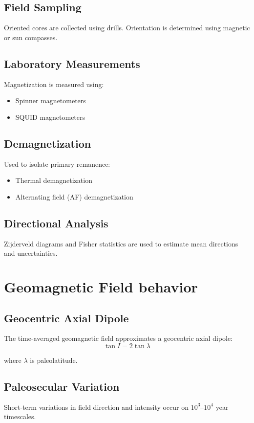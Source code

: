 \subsection{Field Sampling}
Oriented cores are collected using drills. Orientation is determined using magnetic or sun compasses.

\subsection{Laboratory Measurements}
Magnetization is measured using:
\begin{itemize}
\item Spinner magnetometers
\item SQUID magnetometers
\end{itemize}

\subsection{Demagnetization}
Used to isolate primary remanence:
\begin{itemize}
\item Thermal demagnetization
\item Alternating field (AF) demagnetization
\end{itemize}

\subsection{Directional Analysis}
Zijderveld diagrams and Fisher statistics are used to estimate mean directions and uncertainties.

\section{Geomagnetic Field behavior}

\subsection{Geocentric Axial Dipole}

The time-averaged geomagnetic field approximates a geocentric axial dipole:
\begin{equation}
\tan I = 2 \tan \lambda
\end{equation}

where $\lambda$ is paleolatitude.

\subsection{Paleosecular Variation}
Short-term variations in field direction and intensity occur on $10^3$--$10^4$ year timescales.

